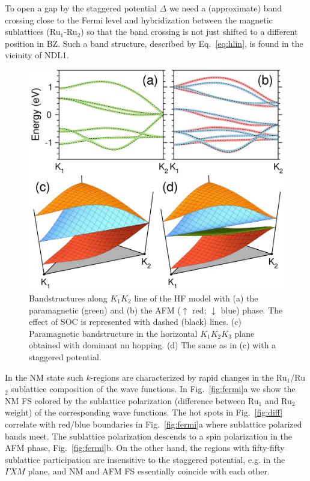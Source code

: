 \documentclass[reprint,twocolumn,superscriptaddress,secnumarabic,amssymb, nobibnotes, aps, prb]{revtex4-1}
\begin{document}
To open a gap by the staggered potential $\Delta$
we need a (approximate) band crossing close to the Fermi level and hybridization between the magnetic sublattices (Ru$_1$-Ru$_2$) so that the band crossing is not just shifted to a different position in BZ. Such a band structure, described by Eq.~\ref{eq:hlin}, is found in the vicinity of NDL1.
\begin{figure}[t]
\centering
\includegraphics[scale=0.2]{fig/fig5.pdf}
\caption{Bandstructures along $K_1K_2$ line of the HF model with (a) the paramagnetic (green) and (b) the AFM ($\uparrow$ red; $\downarrow$ blue) phase. The effect of SOC is represented with dashed (black) lines. (c) Paramagnetic bandstructure in the
horizontal $K_1K_2K_3$ plane obtained with dominant nn hopping. (d) The same as in (c) with a staggered potential.
}
\label{fig:band_detail}
\end{figure}
In the NM state such $k$-regions are characterized by rapid changes in the Ru$_1$/Ru$_2$ sublattice composition of the wave functions.  In Fig.~\ref{fig:fermi}a we show the NM FS colored by the sublattice polarization
(difference between Ru$_1$ and Ru$_2$ weight) of the corresponding wave functions. The hot spots in Fig.~\ref{fig:diff} correlate with red/blue boundaries in Fig.~\ref{fig:fermi}a where sublattice polarized bands
meet. The sublattice polarization descends to a spin polarization in the AFM phase, Fig.~\ref{fig:fermi}b. On the other hand, the regions with fifty-fifty
sublattice participation are insensitive to the staggered potential, e.g. in the $\Gamma XM$ plane, and NM and AFM FS essentially coincide with each other.
\end{document}
